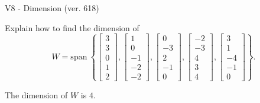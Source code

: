 \begin{exercise}
  \begin{exerciseTitle}V8 - Dimension (ver. 618)\end{exerciseTitle}
  \begin{exerciseStatement}
    Explain how to find the dimension of 
\[W=\mathrm{span}\ \left\{\left[\begin{array}{r}
3 \\
3 \\
0 \\
1 \\
2
\end{array}\right] , \left[\begin{array}{r}
1 \\
0 \\
-1 \\
-2 \\
-2
\end{array}\right] , \left[\begin{array}{r}
0 \\
-3 \\
2 \\
-1 \\
0
\end{array}\right] , \left[\begin{array}{r}
-2 \\
-3 \\
4 \\
3 \\
4
\end{array}\right] , \left[\begin{array}{r}
3 \\
1 \\
-4 \\
-1 \\
0
\end{array}\right]\right\}.\]



  \end{exerciseStatement}
  \begin{exerciseAnswer}
   The dimension of \(W\) is  \(4\).
  


  \end{exerciseAnswer}
\end{exercise}